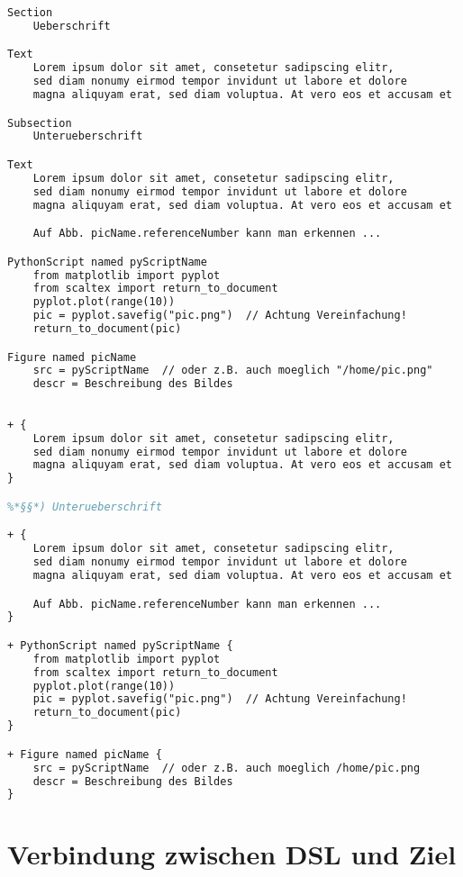 \begin{lstlisting}[language=TeX]
Section
    Ueberschrift

Text
    Lorem ipsum dolor sit amet, consetetur sadipscing elitr,
    sed diam nonumy eirmod tempor invidunt ut labore et dolore
    magna aliquyam erat, sed diam voluptua. At vero eos et accusam et

Subsection
    Unterueberschrift

Text
    Lorem ipsum dolor sit amet, consetetur sadipscing elitr,
    sed diam nonumy eirmod tempor invidunt ut labore et dolore
    magna aliquyam erat, sed diam voluptua. At vero eos et accusam et

    Auf Abb. picName.referenceNumber kann man erkennen ...

PythonScript named pyScriptName
    from matplotlib import pyplot
    from scaltex import return_to_document
    pyplot.plot(range(10))
    pic = pyplot.savefig("pic.png")  // Achtung Vereinfachung!
    return_to_document(pic)

Figure named picName
    src = pyScriptName  // oder z.B. auch moeglich "/home/pic.png"
    descr = Beschreibung des Bildes
\end{lstlisting}

\begin{lstlisting}[language=TeX]
%*§*) Ueberschrift

+ {
    Lorem ipsum dolor sit amet, consetetur sadipscing elitr,
    sed diam nonumy eirmod tempor invidunt ut labore et dolore
    magna aliquyam erat, sed diam voluptua. At vero eos et accusam et
}

%*§§*) Unterueberschrift

+ {
    Lorem ipsum dolor sit amet, consetetur sadipscing elitr,
    sed diam nonumy eirmod tempor invidunt ut labore et dolore
    magna aliquyam erat, sed diam voluptua. At vero eos et accusam et

    Auf Abb. picName.referenceNumber kann man erkennen ...
}

+ PythonScript named pyScriptName {
    from matplotlib import pyplot
    from scaltex import return_to_document
    pyplot.plot(range(10))
    pic = pyplot.savefig("pic.png")  // Achtung Vereinfachung!
    return_to_document(pic)
}

+ Figure named picName {
    src = pyScriptName  // oder z.B. auch moeglich /home/pic.png
    descr = Beschreibung des Bildes
}
\end{lstlisting}


\section{Verbindung zwischen DSL und Ziel}\label{sec-verbindung}


